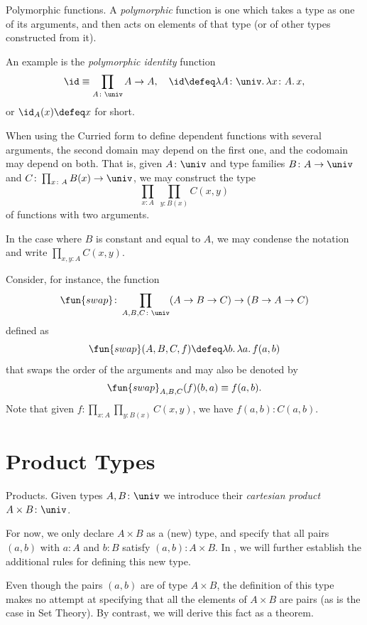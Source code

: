 \begin{lpar}{Polymorphic functions.}
    A \textsl{polymorphic} function is one which takes a type as one of its arguments, and then acts on elements of that type (or of other types constructed from it).

    An example is the \textsl{polymorphic identity} function
    \[
        \id\equiv\prod_{A\colon\univ}A\to A,\quad
        \id\defeq\lambda A\colon\univ.\,\lambda x\colon A.\,x,
    \]
    or $\id_A(x)\defeq x$ for short.

    When using the Curried form to define dependent functions with several arguments, the second domain may depend on the first one, and the codomain may depend on both. That is, given $A\colon\univ$ and type families $B\colon A\to\univ$ and $C\colon\prod_{x\colon A}B(x)\to\univ$, we may construct the type
    \[
        \prod_{x\colon A}\;\prod_{y\colon B(x)}C(x,y)
    \]
    of functions with two arguments.
    
    In the case where $B$ is constant and equal to $A$, we may condense the notation and write $\prod_{x,y\colon A}C(x,y)$.

    Consider, for instance, the function
    \[
        \fun{swap}\colon
            \prod_{A,B,C\colon\univ}(A\to B\to C)\to(B\to A\to C)
    \]
    defined as
    \[
        \fun{swap}(A,B,C,f)\defeq\lambda b.\,\lambda a.\,f(a,b)
    \]
    that swaps the order of the arguments and may also be denoted by 
    \[
        \fun{swap}_{A,B,C}(f)(b,a)\equiv f(a,b).
    \]
    Note that given $f\colon\prod_{x\colon A}\prod_{y\colon B(x)}C(x,y)$, we have $f(a,b)\colon C(a,b)$.
\end{lpar}

\section{Product Types}
\begin{lpar}{Products.}
    Given types $A,B\colon\univ$ we introduce their \textsl{cartesian product} $A\times B\colon\univ$.
    
    For now, we only declare $A\times B$ as a (new) type, and specify that all pairs $(a,b)$ with $a\colon A$ and $b\colon B$ satisfy $(a,b)\colon A\times B$. In , we will further establish the additional rules for defining this new type.
    
    Even though the pairs $(a,b)$ are of type $A\times B$, the definition of this type makes no attempt at specifying that all the elements of $A\times B$ are pairs (as is the case in Set Theory). By contrast, we will derive this fact as a theorem.    
\end{lpar}

